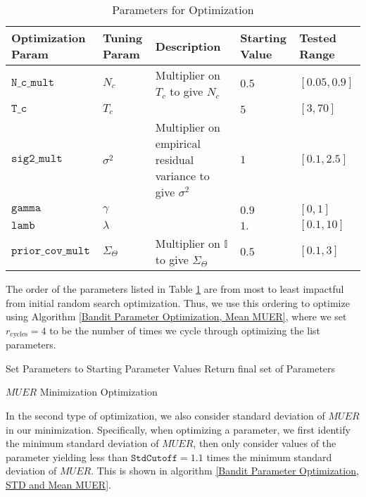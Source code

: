   \begin{table}[h!]
 \caption{Parameters for Optimization}
 \label{Parameter Optimization Table}
 \centering \begin{tabular*}
{0.987\textwidth}
{|p{}|p{}|p{}|p{}|p{}|}
\toprule
Optimization Param & Tuning Param & Description & Starting Value & Tested Range \\
\midrule
$\mathtt{N\_c\_mult}$ & $N_c$ & Multiplier on $T_c$ to give $N_c$ & $0.5$ & $[0.05,0.9]$ \\
$\mathtt{T\_c}$ & $T_c$ &  & $5$ & $[3,70]$ \\
$\mathtt{sig2\_mult}$ & $\sigma^2$ & Multiplier on empirical residual variance to give $\sigma^2$ & $1$ & $[0.1,2.5]$ \\
$\mathtt{gamma}$ & $\gamma$ &  & $0.9$ & $[0,1]$ \\
$\mathtt{lamb}$ & $\lambda$ & & $1.$ & $[0.1,10]$ \\
$\mathtt{prior\_cov\_mult}$ & $\Sigma_\Theta$ & Multiplier on $\mathbb{I}$ to give $\Sigma_\Theta$ & $0.5$ & $[0.1,3]$
\\\bottomrule
\end{tabular*}
  \end{table}

The order of the parameters listed in Table \ref{Parameter Optimization Table} are from most to least impactful from initial random search optimization.  Thus, we use this ordering to optimize using Algorithm \ref{Bandit Parameter Optimization, Mean MUER}, where we set $r_{\text{cycles}} = 4$ to be the number of times we cycle through optimizing the list parameters.

\begin{algorithm}[h!]
 Set Parameters to Starting Parameter Values\;
  Return final set of Parameters\;
 \caption{$MUER$ Minimization Optimization}
 \label{Bandit Parameter Optimization, Mean MUER}
 \end{algorithm}


 In the second type of optimization, we also consider standard deviation of $MUER$ in our minimization.  Specifically, when optimizing a parameter, we first identify the minimum standard deviation of $MUER$, then only consider values of the parameter yielding less than $\mathtt{StdCutoff} = 1.1$ times the minimum standard deviation of $MUER$. This is shown in algorithm \ref{Bandit Parameter Optimization, STD and Mean MUER}. \\


